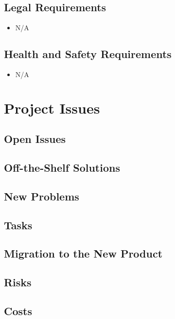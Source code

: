 \documentclass[12pt, titlepage]{article}
\begin{document}
\subsection{Legal Requirements}

\begin{itemize}
  \item[] N/A
\end{itemize}

\subsection{Health and Safety Requirements}

\begin{itemize}
  \item[] N/A
\end{itemize}

\section{Project Issues}

\subsection{Open Issues}

\subsection{Off-the-Shelf Solutions}

\subsection{New Problems}

\subsection{Tasks}

\subsection{Migration to the New Product}

\subsection{Risks}

\subsection{Costs}
\end{document}
